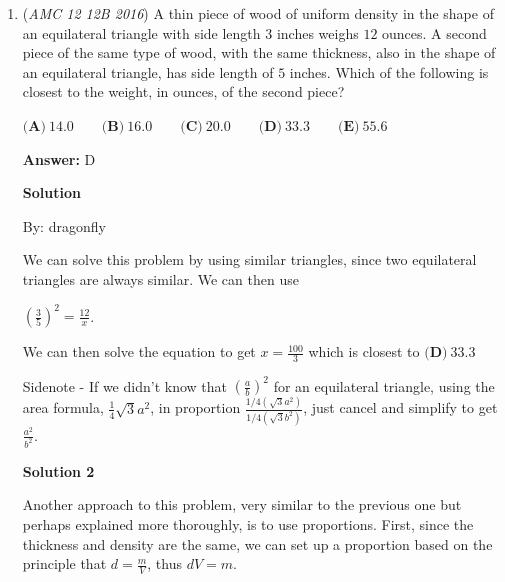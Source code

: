 \begin{enumerate}
\textbf{Solution 2 (Blitz)}

$\boxed{\textbf{(A)}13}$ is odd so it is automatically crossed out in the first selection.

 $\boxed{\textbf{(B)}32}$ and  $\boxed{\textbf{(E)}96}$ behave similarly so they would both get knocked out in the same round.

 $\boxed{\textbf{(C)}56}$ and  $\boxed{\textbf{(D)}64}$ are left, and since it is (slightly) more likely for the number to be larger, we can guess  $\boxed{\textbf{(D)}64}$ if we're really running out of time.

 


	\item (\textit{AMC 12 12B 2016}) A thin piece of wood of uniform density in the shape of an equilateral triangle with side length $3$ inches weighs $12$ ounces. A second piece of the same type of wood, with the same thickness, also in the shape of an equilateral triangle, has side length of $5$ inches. Which of the following is closest to the weight, in ounces, of the second piece?


 $\textbf{(A)}\ 14.0\qquad\textbf{(B)}\ 16.0\qquad\textbf{(C)}\ 20.0\qquad\textbf{(D)}\ 33.3\qquad\textbf{(E)}\ 55.6$

 \textbf{Answer: }D



\textbf{Solution}

By: dragonfly

 We can solve this problem by using similar triangles, since two equilateral triangles are always similar. We can then use

 $\left(\frac{3}{5}\right)^2=\frac{12}{x}$.

 We can then solve the equation to get $x=\frac{100}{3}$ which is closest to $\boxed{\textbf{(D)}\ 33.3}$

 


 Sidenote - If we didn't know that $\left(\frac{a}{b}\right)^2$ for an equilateral triangle, using the area formula, $\frac{1}{4}\sqrt{3}a^2$, in proportion $\frac{1/4(\sqrt{3}a^2)}{1/4(\sqrt{3}b^2)}$, just cancel and simplify to get $\frac{a^2}{b^2}$.

 



\textbf{Solution 2}

Another approach to this problem, very similar to the previous one but perhaps explained more thoroughly, is to use proportions. First, since the thickness and density are the same, we can set up a proportion based on the principle that $d=\frac{m}{V}$, thus $dV=m$. 


\end{enumerate}
